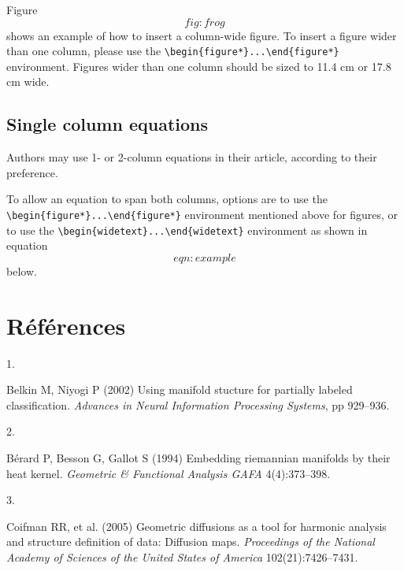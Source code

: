\documentclass[9pt,twocolumn,twoside,]{pnas-new}
\newlength{\cslhangindent}
\newlength{\csllabelwidth}
\newlength{\cslentryspacingunit} %
\newenvironment{CSLReferences}[2] %
 {%
  \setlength{\parindent}{0pt}
  \ifodd #1
  \let\oldpar\par
  \def\par{\hangindent=\cslhangindent\oldpar}
  \fi
  \setlength{\parskip}{#2\cslentryspacingunit}
 }%
 {}
\newcommand{\CSLLeftMargin}[1]{\parbox[t]{\csllabelwidth}{#1}}
\newcommand{\CSLRightInline}[1]{\parbox[t]{\linewidth - \csllabelwidth}{#1}\break}
\begin{document}
Figure \[fig:frog\] shows an example of how to insert a column-wide
figure. To insert a figure wider than one column, please use the
\texttt{\textbackslash{}begin\{figure*\}...\textbackslash{}end\{figure*\}}
environment. Figures wider than one column should be sized to 11.4 cm or
17.8 cm wide.

\hypertarget{single-column-equations}{%
\subsection*{Single column equations}\label{single-column-equations}}

Authors may use 1- or 2-column equations in their article, according to
their preference.

To allow an equation to span both columns, options are to use the
\texttt{\textbackslash{}begin\{figure*\}...\textbackslash{}end\{figure*\}}
environment mentioned above for figures, or to use the
\texttt{\textbackslash{}begin\{widetext\}...\textbackslash{}end\{widetext\}}
environment as shown in equation \[eqn:example\] below.

\showmatmethods

\hypertarget{references}{%
\section*{Références}\label{references}}

\pnasbreak

\hypertarget{refs}{}
\begin{CSLReferences}{0}{0}
\leavevmode{}%
\CSLLeftMargin{1. }%
\CSLRightInline{Belkin M, Niyogi P (2002) Using manifold stucture for
partially labeled classification. \emph{Advances in Neural Information
Processing Systems}, pp 929--936.}

\leavevmode{}%
\CSLLeftMargin{2. }%
\CSLRightInline{Bérard P, Besson G, Gallot S (1994) Embedding riemannian
manifolds by their heat kernel. \emph{Geometric \& Functional Analysis
GAFA} 4(4):373--398.}

\leavevmode{}%
\CSLLeftMargin{3. }%
\CSLRightInline{Coifman RR, et al. (2005) Geometric diffusions as a tool
for harmonic analysis and structure definition of data: Diffusion maps.
\emph{Proceedings of the National Academy of Sciences of the United
States of America} 102(21):7426--7431.}

\end{CSLReferences}



% 
\end{document}
